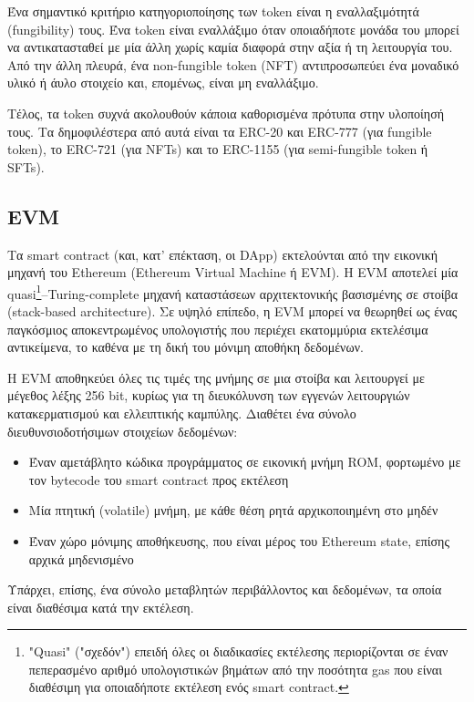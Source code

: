 Ένα σημαντικό κριτήριο κατηγοριοποίησης των token είναι η εναλλαξιμότητά (fungibility) τους. Ένα token είναι εναλλάξιμο όταν οποιαδήποτε μονάδα του μπορεί να αντικατασταθεί με μία άλλη χωρίς καμία διαφορά στην αξία ή τη λειτουργία του. Από την άλλη πλευρά, ένα non-fungible token (NFT) αντιπροσωπεύει ένα μοναδικό υλικό ή άυλο στοιχείο και, επομένως, είναι μη εναλλάξιμο.

Τέλος, τα token συχνά ακολουθούν κάποια καθορισμένα πρότυπα στην υλοποίησή τους. Τα δημοφιλέστερα από αυτά είναι τα ERC-20 και ERC-777 (για fungible token), το ERC-721 (για NFTs) και το ERC-1155 (για semi-fungible token ή SFTs).

\subsection{EVM} \label{subsection:2-6-5-evm}
Τα smart contract (και, κατ' επέκταση, οι DApp) εκτελούνται από την εικονική μηχανή του Ethereum (Ethereum Virtual Machine ή EVM). Η EVM αποτελεί μία quasi\footnote{"Quasi" ("σχεδόν") επειδή όλες οι διαδικασίες εκτέλεσης περιορίζονται σε έναν πεπερασμένο αριθμό υπολογιστικών βημάτων από την ποσότητα gas που είναι διαθέσιμη για οποιαδήποτε εκτέλεση ενός smart contract.}–Turing-complete μηχανή καταστάσεων αρχιτεκτονικής βασισμένης σε στοίβα (stack-based architecture). Σε υψηλό επίπεδο, η EVM μπορεί να θεωρηθεί ως ένας παγκόσμιος αποκεντρωμένος υπολογιστής που περιέχει εκατομμύρια εκτελέσιμα αντικείμενα, το καθένα με τη δική του μόνιμη αποθήκη δεδομένων.

Η EVM αποθηκεύει όλες τις τιμές της μνήμης σε μια στοίβα και λειτουργεί με μέγεθος λέξης 256 bit, κυρίως για τη διευκόλυνση των εγγενών λειτουργιών κατακερματισμού και ελλειπτικής καμπύλης. Διαθέτει ένα σύνολο διευθυνσιοδοτήσιμων στοιχείων δεδομένων:

\begin{itemize}
	\item Έναν αμετάβλητο κώδικα προγράμματος σε εικονική μνήμη ROM, φορτωμένο με τον \textenglish{bytecode} του smart contract προς εκτέλεση
	\item Μία πτητική (volatile) μνήμη, με κάθε θέση ρητά αρχικοποιημένη στο μηδέν
	\item Έναν χώρο μόνιμης αποθήκευσης, που είναι μέρος του Ethereum state, επίσης αρχικά μηδενισμένο
\end{itemize}

Υπάρχει, επίσης, ένα σύνολο μεταβλητών περιβάλλοντος και δεδομένων, τα οποία είναι διαθέσιμα κατά την εκτέλεση.\cite{2.6-ethereum-mastering}
